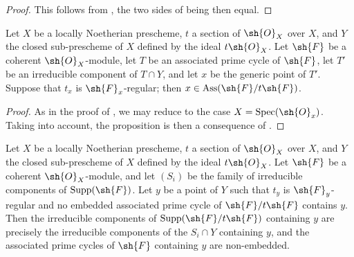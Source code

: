 \begin{proof}
This follows from , the two sides of  being then equal.
\end{proof}

\begin{proposition}[3.4.3]
\label{IV.3.4.3}
Let $X$ be a locally Noetherian prescheme, $t$ a section of $\sh{O}_X$ over $X$, and $Y$ the closed sub-prescheme of $X$ defined by the ideal $t\sh{O}_X$.
Let $\sh{F}$ be a coherent $\sh{O}_X$-module, let $T$ be an associated prime cycle of $\sh{F}$, let $T'$ be an irreducible component of $T\cap Y$, and let $x$ be the generic point of $T'$.
Suppose that $t_x$ is $\sh{F}_x$-regular; then $x\in\operatorname{Ass}(\sh{F}/t\sh{F})$.
\end{proposition}

\begin{proof}
As in the proof of , we may reduce to the case $X=\operatorname{Spec}(\sh{O}_x)$.
Taking  into account, the proposition is then a consequence of .
\end{proof}

\begin{proposition}[3.4.4]
\label{IV.3.4.4}
Let $X$ be a locally Noetherian prescheme, $t$ a section of $\sh{O}_X$ over $X$, and $Y$ the closed sub-prescheme of $X$ defined by the ideal $t\sh{O}_X$.
Let $\sh{F}$ be a coherent $\sh{O}_X$-module, and let $(S_i)$ be the family of irreducible components of $\operatorname{Supp}(\sh{F})$.
Let $y$ be a point of $Y$ such that $t_y$ is $\sh{F}_y$-regular and no embedded associated prime cycle of $\sh{F}/t\sh{F}$ contains $y$.
Then the irreducible components of $\operatorname{Supp}(\sh{F}/t\sh{F})$ containing $y$ are precisely the irreducible components of the $S_i\cap Y$ containing $y$, and the associated prime cycles of $\sh{F}$ containing $y$ are non-embedded.
\end{proposition}

